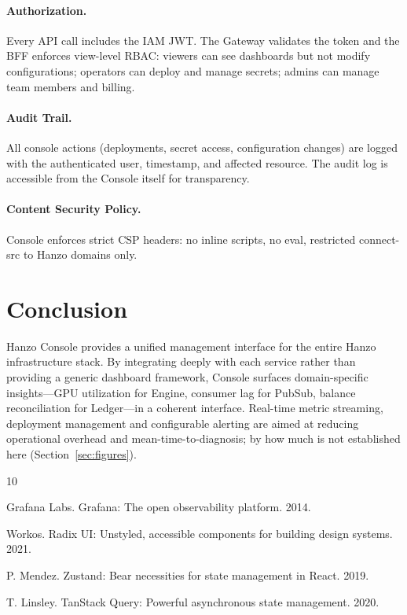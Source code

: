 \documentclass[11pt,twocolumn]{article}
\begin{document}
\paragraph{Authorization.} Every API call includes the IAM JWT. The Gateway validates the token and the BFF enforces view-level RBAC: viewers can see dashboards but not modify configurations; operators can deploy and manage secrets; admins can manage team members and billing.

\paragraph{Audit Trail.} All console actions (deployments, secret access, configuration changes) are logged with the authenticated user, timestamp, and affected resource. The audit log is accessible from the Console itself for transparency.

\paragraph{Content Security Policy.} Console enforces strict CSP headers: no inline scripts, no eval, restricted connect-src to Hanzo domains only.

\section{Conclusion}

Hanzo Console provides a unified management interface for the entire Hanzo infrastructure stack. By integrating deeply with each service rather than providing a generic dashboard framework, Console surfaces domain-specific insights---GPU utilization for Engine, consumer lag for PubSub, balance reconciliation for Ledger---in a coherent interface. Real-time metric streaming, deployment management and configurable alerting are aimed at reducing operational overhead and mean-time-to-diagnosis; by how much is not established here (Section~\ref{sec:figures}).


\begin{thebibliography}{10}

Grafana Labs. Grafana: The open observability platform. 2014.

Workos. Radix UI: Unstyled, accessible components for building design systems. 2021.

P. Mendez. Zustand: Bear necessities for state management in React. 2019.

T. Linsley. TanStack Query: Powerful asynchronous state management. 2020.

\end{thebibliography}
\end{document}
